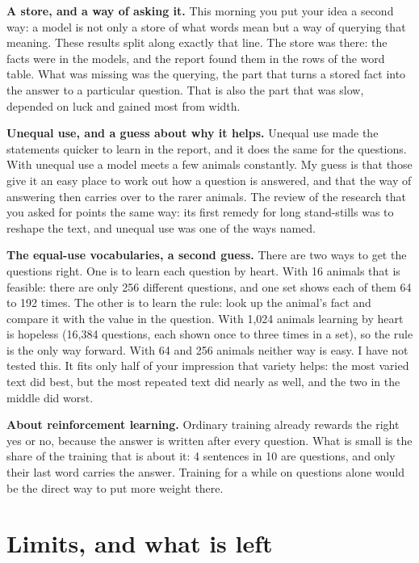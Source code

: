 \textbf{A store, and a way of asking it.} This morning you put your idea a second way: a model
is not only a store of what words mean but a way of querying that meaning. These results split
along exactly that line. The store was there: the facts were in the models, and the report
found them in the rows of the word table. What was missing was the querying, the part that
turns a stored fact into the answer to a particular question. That is also the part that was
slow, depended on luck and gained most from width.

\textbf{Unequal use, and a guess about why it helps.} Unequal use made the statements quicker
to learn in the report, and it does the same for the questions. With unequal use a model meets
a few animals constantly. My guess is that those give it an easy place to work out how a
question is answered, and that the way of answering then carries over to the rarer animals.
The review of the research that you asked for points the same way: its first remedy for long
stand-stills was to reshape the text, and unequal use was one of the ways named.

\textbf{The equal-use vocabularies, a second guess.} There are two ways to get the questions
right. One is to learn each question by heart. With 16 animals that is feasible: there are
only 256 different questions, and one set shows each of them 64 to 192 times. The other is to
learn the rule: look up the animal's fact and compare it with the value in the question. With
1,024 animals learning by heart is hopeless (16,384 questions, each shown once to three times
in a set), so the rule is the only way forward. With 64 and 256 animals neither way is easy. I
have not tested this. It fits only half of your impression that variety helps: the most varied
text did best, but the most repeated text did nearly as well, and the two in the middle did
worst.

\textbf{About reinforcement learning.} Ordinary training already rewards the right yes or no,
because the answer is written after every question. What is small is the share of the training
that is about it: 4 sentences in 10 are questions, and only their last word carries the
answer. Training for a while on questions alone would be the direct way to put more weight
there.

\section{Limits, and what is left}

